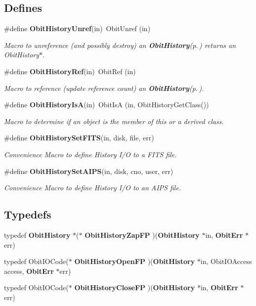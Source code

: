 \subsection*{Defines}
\begin{CompactItemize}
\item 
\#define {\bf Obit\-History\-Unref}(in)\ Obit\-Unref (in)
\begin{CompactList}\small\item\em Macro to unreference (and possibly destroy) an {\bf Obit\-History}{\rm (p.\,\pageref{structObitHistory})} returns an Obit\-History$\ast$. \item\end{CompactList}\item 
\#define {\bf Obit\-History\-Ref}(in)\ Obit\-Ref (in)
\begin{CompactList}\small\item\em Macro to reference (update reference count) an {\bf Obit\-History}{\rm (p.\,\pageref{structObitHistory})}. \item\end{CompactList}\item 
\#define {\bf Obit\-History\-Is\-A}(in)\ Obit\-Is\-A (in, Obit\-History\-Get\-Class())
\begin{CompactList}\small\item\em Macro to determine if an object is the member of this or a derived class. \item\end{CompactList}\item 
\#define {\bf Obit\-History\-Set\-FITS}(in, disk, file, err)
\begin{CompactList}\small\item\em Convenience Macro to define History I/O to a FITS file. \item\end{CompactList}\item 
\#define {\bf Obit\-History\-Set\-AIPS}(in, disk, cno, user, err)
\begin{CompactList}\small\item\em Convenience Macro to define History I/O to an AIPS file. \item\end{CompactList}\end{CompactItemize}
\subsection*{Typedefs}
\begin{CompactItemize}
\item 
typedef {\bf Obit\-History} $\ast$($\ast$ {\bf Obit\-History\-Zap\-FP} )({\bf Obit\-History} $\ast$in, {\bf Obit\-Err} $\ast$err)
\item 
typedef Obit\-IOCode($\ast$ {\bf Obit\-History\-Open\-FP} )({\bf Obit\-History} $\ast$in, Obit\-IOAccess access, {\bf Obit\-Err} $\ast$err)
\item 
typedef Obit\-IOCode($\ast$ {\bf Obit\-History\-Close\-FP} )({\bf Obit\-History} $\ast$in, {\bf Obit\-Err} $\ast$err)
\end{CompactItemize}
